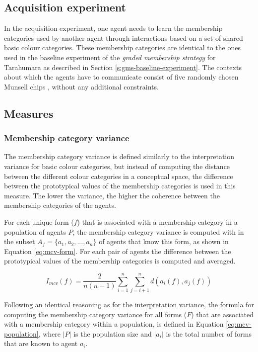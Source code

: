 \subsection{Acquisition experiment}

In the acquisition experiment, one agent needs to learn the membership
categories used by another agent through interactions based on a set
of shared basic colour categories. These membership categories are
identical to the ones used in the baseline experiment of the
\emph{graded membership strategy} for Tarahumara as described in
Section \ref{s:gms-baseline-experiment}. The contexts about which the
agents have to communicate consist of five randomly chosen Munsell
chips \citep{newhall42final}, without any additional constraints.

\subsection{Measures}

\subsubsection{Membership category variance}

The membership category variance is defined similarly to the
interpretation variance for basic colour categories, but instead of
computing the distance between the different colour categories in a
conceptual space, the difference between the prototypical values of
the membership categories is used in this measure. The lower the
variance, the higher the coherence between the membership categories
of the agents.

For each unique form ($f$) that is associated with a membership category
in a population of agents $P$, the membership category variance is
computed with in the subset $A_f = \{a_1, a_2, ..., a_n\}$ of agents
that know this form, as shown in Equation \ref{eq:mcv-form}. For each
pair of agents the difference between the prototypical values of the
membership categories is computed and averaged.

\begin{equation}
I_{mcv}(f) = \frac{2}{n(n-1)} \sum^n_{i=1} \sum^n_{j=i+1} d(a_i(f), a_j(f))
\label{eq:mcv-form}
\end{equation}

Following an identical reasoning as for the interpretation variance,
the formula for computing the membership category variance for all
forms ($F$) that are associated with a membership category within a
population, is defined in Equation \ref{eq:mcv-population}, where
$|P|$ is the population size and $|a_i|$ is the total number of forms
that are known to agent $a_i$.

